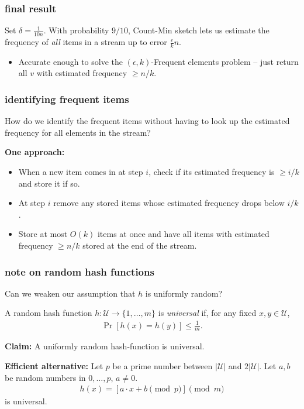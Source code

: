 \documentclass[]{beamer}
\begin{document}
\begin{frame}
		\frametitle{final result}
		Set $\delta = \frac{1}{10n}$. With probability $9/10$, Count-Min sketch lets us estimate the frequency of \emph{all} items in a stream up to error $\frac{\epsilon}{k}n$.
		\begin{itemize}
			\item Accurate enough to solve the $(\epsilon,k)$-Frequent elements problem -- just return all $v$ with estimated frequency $\geq n/k$.
		\end{itemize}
\end{frame}

	
	\begin{frame}
		\frametitle{identifying frequent items}
		How do we identify the frequent items without having to look up the estimated frequency for all elements in the stream? 
		
		\textbf{One approach:} 
		\begin{itemize}
			\item When a new item comes in at step $i$, check if its estimated frequency is $\ge i/k$ and store it if so.
			\item At step $i$ remove any stored items whose estimated frequency drops below $i/k$. 
			\item Store at most $O(k)$ items at once and have all items with estimated frequency $\ge n/k$ stored at the end of the stream.
		\end{itemize}
		
	\end{frame}
	
	\begin{frame}
		\frametitle{note on random hash functions}
		Can we weaken our assumption that $h$ is uniformly random?
		\begin{definition}
			A random hash function $h: \mathcal{U} \rightarrow \{1, \ldots, m\}$ is \emph{universal} if, for any fixed $x,y\in \mathcal{U}$,
			\begin{align*}
				\Pr[h(x) = h(y)] \leq \frac{1}{m}.
			\end{align*}
		\end{definition}
		\textbf{Claim:} A uniformly random hash-function is universal. 
		
		\textbf{Efficient alternative:} Let $p$ be a prime number between $|\mathcal{U}|$ and $2|\mathcal{U}|$. Let $a,b$ be random numbers in $0,\ldots, p$, $a\neq 0$.
		\begin{align*}
			h(x) = \left[a\cdot x + b \pmod{p}\right] \pmod{m}
		\end{align*} 
		is universal.
	\end{frame}
	
\end{document}
